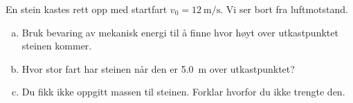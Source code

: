 %
En stein kastes rett opp med startfart $v_0 = \SI{12}{\metre\per\second}$. Vi ser bort fra luftmotstand.
\begin{enumerate}[a)]
    \item Bruk bevaring av mekanisk energi til å finne hvor høyt over utkastpunktet steinen kommer.
    \item Hvor stor fart har steinen når den er \SI{5.0}{\metre} over utkastpunktet?
    \item Du fikk ikke oppgitt massen til steinen. Forklar hvorfor du ikke trengte den.
\end{enumerate}

